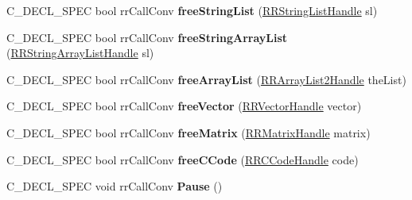 \begin{DoxyCompactItemize}
\item 
\hypertarget{group__loadsave_ga63aea4cfe3b5262e67d50f3227153a16}{
\-C\-\_\-\-D\-E\-C\-L\-\_\-\-S\-P\-E\-C bool rr\-Call\-Conv {\bfseries free\-String\-List} (\hyperlink{rr__c__types_8h_abf561b014879247b7b92ee99c205de21}{\-R\-R\-String\-List\-Handle} sl)}
\label{group__loadsave_ga63aea4cfe3b5262e67d50f3227153a16}

\item 
\hypertarget{group__loadsave_gacca647731a9241ab1f517d569271688b}{
\-C\-\_\-\-D\-E\-C\-L\-\_\-\-S\-P\-E\-C bool rr\-Call\-Conv {\bfseries free\-String\-Array\-List} (\hyperlink{struct_r_r_string_array_list}{\-R\-R\-String\-Array\-List\-Handle} sl)}
\label{group__loadsave_gacca647731a9241ab1f517d569271688b}

\item 
\hypertarget{group__loadsave_ga8d0882fc56ccdc67b489cdcb82522ac6}{
\-C\-\_\-\-D\-E\-C\-L\-\_\-\-S\-P\-E\-C bool rr\-Call\-Conv {\bfseries free\-Array\-List} (\hyperlink{rr__c__types_8h_a21a10f01ac4fd34c61e7e7d12af9891d}{\-R\-R\-Array\-List2\-Handle} the\-List)}
\label{group__loadsave_ga8d0882fc56ccdc67b489cdcb82522ac6}

\item 
\hypertarget{group__loadsave_ga11dddcdb661f8e82a2f87ecb24ab8968}{
\-C\-\_\-\-D\-E\-C\-L\-\_\-\-S\-P\-E\-C bool rr\-Call\-Conv {\bfseries free\-Vector} (\hyperlink{rr__c__types_8h_aea46a16752b0ae2cd95c009030ee630e}{\-R\-R\-Vector\-Handle} vector)}
\label{group__loadsave_ga11dddcdb661f8e82a2f87ecb24ab8968}

\item 
\hypertarget{group__loadsave_gabbbbce24954114b22b13337ccaf63529}{
\-C\-\_\-\-D\-E\-C\-L\-\_\-\-S\-P\-E\-C bool rr\-Call\-Conv {\bfseries free\-Matrix} (\hyperlink{rr__c__types_8h_a87174eefa58ae98dec58c9253ae6c5da}{\-R\-R\-Matrix\-Handle} matrix)}
\label{group__loadsave_gabbbbce24954114b22b13337ccaf63529}

\item 
\hypertarget{group__loadsave_ga79f31e58a4a2d24d2f604f4369b6c64f}{
\-C\-\_\-\-D\-E\-C\-L\-\_\-\-S\-P\-E\-C bool rr\-Call\-Conv {\bfseries free\-C\-Code} (\hyperlink{rr__c__types_8h_aaaa74f20722a48f3ae9ed5bdbb6c8a86}{\-R\-R\-C\-Code\-Handle} code)}
\label{group__loadsave_ga79f31e58a4a2d24d2f604f4369b6c64f}

\item 
\hypertarget{group__loadsave_ga5945592b2369af769505a47463be2a43}{
\-C\-\_\-\-D\-E\-C\-L\-\_\-\-S\-P\-E\-C void rr\-Call\-Conv {\bfseries \-Pause} ()}
\label{group__loadsave_ga5945592b2369af769505a47463be2a43}


\end{DoxyCompactItemize}
